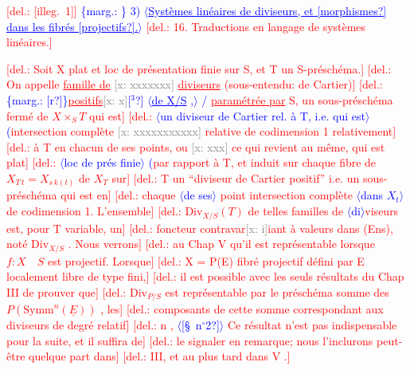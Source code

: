 \documentclass[11pt]{article}
\newcommand{\scanpage}[1]{\par\bigskip\noindent{\small\sffamily[scan #1]}\par}
\newcommand{\mspage}[1]{{\small\sffamily[p.\,#1]}}
\newcommand{\hand}[1]{\textcolor{blue}{#1}}
\newcommand{\inserted}[2][]{\textcolor{blue}{$\langle$#2$\rangle$}}
\newcommand{\margin}[1]{\textcolor{blue}{\{\textsf{marg.:} #1\}}}
\newcommand{\deleted}[1]{\textcolor{red}{[\textsf{del.:} #1]}}
\newcommand{\xout}[1]{\textcolor{gray}{[\textsf{x:} #1]}}
\newcommand{\uline}[1]{\underline{#1}}
\newcommand{\unsure}[1]{[#1?]}
\newcommand{\illegible}[1]{[\textsf{illeg.\ #1}]}
\begin{document}
\mspage{111}

\clearpage
\scanpage{25/112}
\mspage{15}

\deleted{\illegible{1}} \margin{} \hand{3)} \inserted{\uline{Systèmes linéaires de diviseurs, et \unsure{morphismes} dans les fibrés \unsure{projectifs}.}}
\deleted{16. Traductions en langage de systèmes linéaires.}

\deleted{Soit X plat et loc de présentation finie sur S, et T un S-préschéma.}
\deleted{On appelle \uline{famille de} \xout{xxxxxxx} \uline{diviseurs} (sous-entendu: de Cartier)}
\deleted{\margin{\unsure{r}}\uline{positifs}\xout{x}\hand{\unsure{$^{3}$}} \inserted[typed]{\uline{de X/S} \hand{,}} \hand{/} \uline{paramétrée par} S, un sous-préschéma fermé de $X\times_S T$ qui est}
\deleted{\inserted{un diviseur de Cartier rel. à T, i.e. qui est} \hand{(}intersection complète \xout{xxxxxxxxxxx} relative de codimension 1 relativement}
\deleted{à T en chacun de ses points, ou \xout{xxx} ce qui revient au même, qui est plat}
\deleted{\inserted[typed]{loc de prés finie} \hand{(}par rapport à T, et induit sur chaque fibre de $X_{T\,t} = X_{s\,k(t)}$ de $X_T$ sur}
\deleted{T un ``diviseur de Cartier positif'' i.e. un sous-préschéma qui est en}
\deleted{chaque \inserted{de ses} point intersection complète \inserted[typed]{dans $X_t$} de codimension 1. L'ensemble}
\deleted{$\mathrm{Div}_{X/S}(T)$ de telles familles de \inserted[typed]{di}viseurs est, pour T variable, un}
\deleted{foncteur contravar\xout{i}iant à valeurs dans (Ens), noté $\mathrm{Div}_{X/S}$ . Nous verrons}
\deleted{au Chap V qu'il est représentable lorsque $f:X\quad S$ est projectif. Lorsque}
\deleted{X = P(E) fibré projectif défini par E localement libre de type fini,}
\deleted{il est possible avec les seuls résultats du Chap III de prouver que}
\deleted{$\mathrm{Div}_{P/S}$ est représentable par le préschéma somme des $P(\mathrm{Symm}^n(\underline{E}))$ , les}
\deleted{composants de cette somme correspondant aux diviseurs de degré relatif}
\deleted{n , \inserted{\unsure{\S\ n$^{\circ}$2}} Ce résultat n'est pas indispensable pour la suite, et il suffira de}
\deleted{le signaler en remarque; nous l'inclurons peut-être quelque part dans}
\deleted{III, et au plus tard dans V .}
\end{document}
